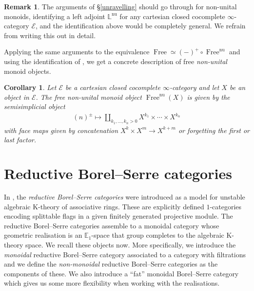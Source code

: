 \documentclass[12pt, reqno]{amsart}
\theoremstyle{plain}
\newtheorem{corollary}[theorem]{Corollary}
\theoremstyle{definition}
\newtheorem{remark}[theorem]{Remark}
\begin{document}
\begin{remark}
The arguments of \S \ref{unravelling} should go through for non-unital monoids, identifying a left adjoint $\mathbb{L}^{\operatorname{nu}}$ for any cartesian closed cocomplete $\infty$-category $\mathcal{E}$, and the identification above would be completely general. We refrain from writing this out in detail.
\end{remark}

Applying the same arguments to the equivalence $\operatorname{Free}\simeq (-)^+\circ \operatorname{Free}^{\operatorname{nu}}$ and using the identification of , we get a concrete description of free \textit{non-unital} monoid objects.

\begin{corollary}\label{free non-unital monoid objects}
Let $\mathcal{E}$ be a cartesian closed cocomplete $\infty$-category and let $X$ be an object in $\mathcal{E}$. The free non-unital monoid object $\operatorname{Free}^{\operatorname{nu}}(X)$ is given by the semisimplicial object
\begin{align*}
(n)^\pm\mapsto \coprod_{k_1,\ldots,k_n> 0} X^{k_1}\times \cdots \times X^{k_n}
\end{align*}
with face maps given by concatenation $X^k\times X^m\rightarrow X^{k+m}$ or forgetting the first or last factor.
\end{corollary}


\section{Reductive Borel--Serre categories}

In \cite{ClausenOrsnesJansen}, the \textit{reductive Borel--Serre categories} were introduced as a model for unstable algebraic K-theory of associative rings. These are explicitly defined $1$-categories encoding splittable flags in a given finitely generated projective module. The reductive Borel--Serre categories assemble to a monoidal category whose geometric realisation is an $\mathbb{E}_1$-space that group completes to the algebraic K-theory space. We recall these objects now. More specifically, we introduce the \textit{monoidal} reductive Borel--Serre category associated to a category with filtrations and we define the \textit{non-monoidal} reductive Borel--Serre categories as the components of these. We also introduce a ``fat'' monoidal Borel--Serre category which gives us some more flexibility when working with the realisations.
\end{document}
